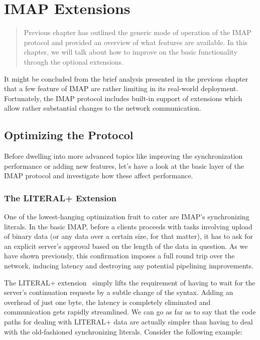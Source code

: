 \documentclass[trojita]{subfiles}
\begin{document}
\chapter{IMAP Extensions}
\label{sec:imap-extensions}

\begin{abstract}
  Previous chapter has outlined the generic mode of operation of the IMAP protocol and provided an overview of what
  features are available.  In this chapter, we will talk about how to improve on the basic functionality through the
  optional extensions.
\end{abstract}

It might be concluded from the brief analysis presented in the previous chapter that a few feature of IMAP are rather
limiting in its real-world deployment.  Fortunately, the IMAP protocol includes built-in support of extensions which
allow rather substantial changes to the network communication.

\section{Optimizing the Protocol}

Before dwelling into more advanced topics like improving the synchronization performance or adding new features, let's
have a look at the basic layer of the IMAP protocol and investigate how these affect performance.

\subsection{The LITERAL+ Extension}
\label{sec:imap-literalplus}

One of the lowest-hanging optimization fruit to cater are IMAP's synchronizing literals.  In the basic IMAP, before a
clients proceeds with tasks involving upload of binary data (or any data over a certain size, for that matter), it has
to ask for an explicit server's approval based on the length of the data in question.  As we have shown previously, this
confirmation imposes a full round trip over the network, inducing latency and destroying any potential pipelining
improvements.

The LITERAL+ extension~\cite{rfc2088} simply lifts the requirement of having to wait for the server's continuation
requests by a subtle change of the syntax.  Adding an overhead of just one byte, the latency is completely eliminated
and communication gets rapidly streamlined.  We can go as far as to say that the code paths for dealing with LITERAL+
data are actually simpler than having to deal with the old-fashioned synchronizing literals.  Consider the following
example:
\end{document}
